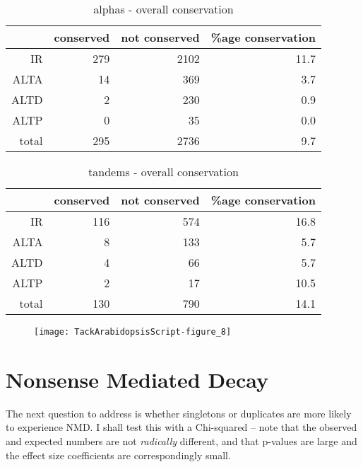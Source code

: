 \documentclass{article}
\begin{document}
\begin{table}[ht]
\centering
\begin{tabular}{rrrr}
  \hline
 & conserved & not conserved & \%age conservation \\ 
  \hline
IR & 279 & 2102 & 11.7 \\ 
  ALTA & 14 & 369 & 3.7 \\ 
  ALTD & 2 & 230 & 0.9 \\ 
  ALTP & 0 & 35 & 0.0 \\ 
  total & 295 & 2736 & 9.7 \\ 
   \hline
\end{tabular}
\caption{alphas - overall conservation} 
\end{table}%
\begin{table}[ht]
\centering
\begin{tabular}{rrrr}
  \hline
 & conserved & not conserved & \%age conservation \\ 
  \hline
IR & 116 & 574 & 16.8 \\ 
  ALTA & 8 & 133 & 5.7 \\ 
  ALTD & 4 & 66 & 5.7 \\ 
  ALTP & 2 & 17 & 10.5 \\ 
  total & 130 & 790 & 14.1 \\ 
   \hline
\end{tabular}
\caption{tandems - overall conservation} 
\end{table}



\begin{figure}[h]
\begin{center}
\texttt{[image: TackArabidopsisScript-figure\_8]}
\end{center}
\caption{}
\label{fig:fig8}
\end{figure}

\section*{Nonsense Mediated Decay}

The next question to address is whether singletons or duplicates are more likely to experience NMD. I shall test this with a Chi-squared -- note that the observed and expected numbers are not \textit{radically} different, and that p-values are large and the effect size coefficients are correspondingly small.
\end{document}
